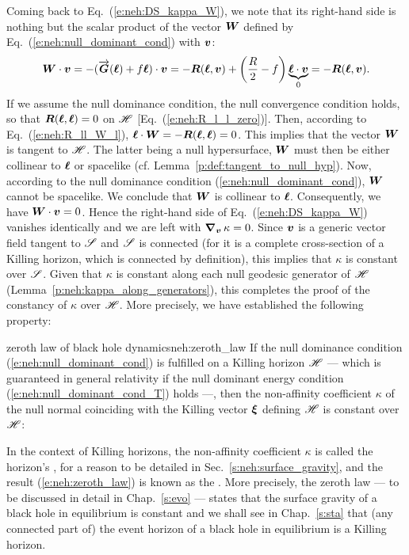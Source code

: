 Coming back to Eq.~(\ref{e:neh:DS_kappa_W}), we note that its right-hand side
is nothing but the scalar product of the vector $\bm{W}$
defined by Eq.~(\ref{e:neh:null_dominant_cond}) with $\bm{v}$:
\[
    \bm{W}\cdot\bm{v} = - (\overrightarrow{\bm{G}}(\bm{\ell}) + f \bm{\ell})\cdot\bm{v}
    = - \bm{R}(\bm{\ell}, \bm{v}) + \left( \frac{R}{2} - f \right) \underbrace{\bm{\ell}\cdot\bm{v}}_{0}
    = - \bm{R}(\bm{\ell}, \bm{v}) .
\]
If we assume the null dominance condition, the null convergence condition
holds, so that $\bm{R}(\bm{\ell}, \bm{\ell}) = 0$ on $\mathscr{H}$ [Eq.~(\ref{e:neh:R_l_l_zero})].
Then, according to Eq.~(\ref{e:neh:R_ll_W_l}),
$\bm{\ell} \cdot \bm{W} = - \bm{R}(\bm{\ell}, \bm{\ell}) = 0$.
This implies that the vector $\bm{W}$ is tangent to $\mathscr{H}$. The latter
being a null hypersurface, $\bm{W}$ must then be
either collinear to $\bm{\ell}$ or spacelike (cf. Lemma~\ref{p:def:tangent_to_null_hyp}).
Now, according to the null dominance condition (\ref{e:neh:null_dominant_cond}),
$\bm{W}$ cannot be
spacelike. We conclude that $\bm{W}$ is collinear to $\bm{\ell}$. Consequently,
we have $\bm{W}\cdot\bm{v} = 0$.
Hence the right-hand side of Eq.~(\ref{e:neh:DS_kappa_W}) vanishes identically
and we are left with $\bm{\nabla}_{\bm{v}} \, \kappa = 0$. Since $\bm{v}$ is a generic
vector field tangent to $\mathscr{S}$ and $\mathscr{S}$ is connected (for it is a complete cross-section
of a Killing horizon, which is connected by definition),
this implies that
$\kappa$ is constant over $\mathscr{S}$. Given that $\kappa$ is
constant along each null geodesic generator of $\mathscr{H}$ (Lemma~\ref{p:neh:kappa_along_generators}), this completes the proof of the constancy
of $\kappa$ over $\mathscr{H}$. More precisely, we have established
the following property:

\begin{tprop}{zeroth law of black hole dynamics}{neh:zeroth_law}
If the null dominance condition
(\ref{e:neh:null_dominant_cond})
is fulfilled on a Killing horizon $\mathscr{H}$ --- which is guaranteed in general relativity
if the null dominant energy condition (\ref{e:neh:null_dominant_cond_T}) holds ---, then the non-affinity coefficient $\kappa$
of the null normal coinciding with the Killing vector $\bm{\xi}$ defining $\mathscr{H}$
is constant over $\mathscr{H}$:
\be \label{e:neh:zeroth_law}
\ee
\end{tprop}
In the context of Killing horizons, the non-affinity coefficient $\kappa$ is
called the horizon's ,
for a reason to be detailed in Sec.~\ref{s:neh:surface_gravity},
and the result
(\ref{e:neh:zeroth_law}) is known as the
. More precisely,
the zeroth law --- to be discussed in detail in Chap.~\ref{s:evo} ---
states that the surface gravity of a black hole in equilibrium is
constant and we shall see in Chap.~\ref{s:sta} that (any connected part of)
the event horizon of a black hole in equilibrium is a Killing horizon.


